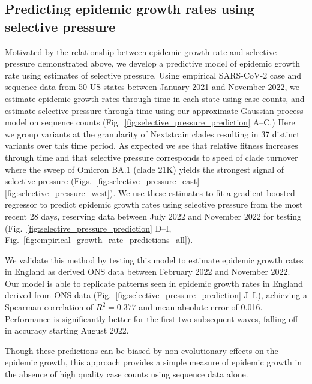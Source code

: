 \documentclass[11pt,oneside,letterpaper]{article}
\def\tbc#1{\textcolor{purple}{[#1]}}
\begin{document}
\subsection*{Predicting epidemic growth rates using selective pressure}

Motivated by the relationship between epidemic growth rate and selective pressure demonstrated above, we develop a predictive model of epidemic growth rate using estimates of selective pressure.
Using empirical SARS-CoV-2 case and sequence data from 50 US states between January 2021 and November 2022, we estimate epidemic growth rates through time in each state using case counts, and estimate selective pressure through time using our approximate Gaussian process model on sequence counts  (Fig.~\ref{fig:selective_pressure_prediction} A--C.)
Here we group variants at the granularity of Nextstrain clades \cite{aksamentov2021nextclade} resulting in 37 distinct variants over this time period.
As expected we see that relative fitness increases through time and that selective pressure corresponds to speed of clade turnover where the sweep of Omicron BA.1 (clade 21K) yields the strongest signal of selective pressure (Figs.~\ref{fig:selective_pressure_east}--\ref{fig:selective_pressure_west}).
We use these estimates to fit a gradient-boosted regressor to predict epidemic growth rates using selective pressure from the most recent 28 days, reserving data between July 2022 and November 2022 for testing (Fig.~\ref{fig:selective_pressure_prediction} D--I, Fig.~\ref{fig:empirical_growth_rate_predictions_all}).

We validate this method by testing this model to estimate epidemic growth rates in England as derived ONS data between February 2022 and November 2022.
Our model is able to replicate patterns seen in epidemic growth rates in England derived from ONS data (Fig.~\ref{fig:selective_pressure_prediction} J--L), achieving a Spearman correlation of $R^2 = 0.377$ and mean absolute error of 0.016.
Performance is significantly better for the first two subsequent waves, falling off in accuracy starting August 2022.

Though these predictions can be biased by non-evolutionary effects on the epidemic growth, this approach provides a simple measure of epidemic growth in the absence of high quality case counts using sequence data alone.
\end{document}
